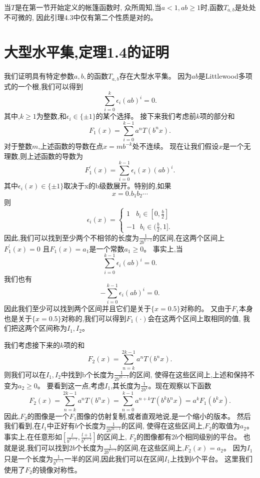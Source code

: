 \begin{remark}
      当$T$是在第一节开始定义的帐篷函数时,
      众所周知,当$a<1,ab\ge1$时,函数$T_{a,b}$是处处不可微的,
      因此引理$4.3$中仅有第二个性质是对的。
\end{remark}

\section{大型水平集,定理1.4的证明}

我们证明具有特定参数$a,b,$的函数$T_{a,b}$存在大型水平集。
因为$ab$是Littlewood多项式的一个根,我们可以得到
$$
\sum_{i=0}^k\epsilon_i(ab)^i=0.
$$
其中,$k\ge1$为整数,和$\epsilon_i\in\{\pm1\}$的某个选择。
接下来我们考虑前$k$项的部分和
$$
F_1(x)=\sum_{i=0}^{k-1}a^nT(b^nx).
$$
对于整数$m$,上述函数的导数在点$x=mb^{-k}$处不连续。
现在让我们假设$x$是一个无理数,则上述函数的导数为
$$
F_1^\prime(x)=\sum_{i=0}^{k-1}\epsilon_i(x)(ab)^i.
$$
其中$\epsilon_i(x)\in\{\pm1\}$取决于x的b级数展开。特别的,如果
$$
x=0.b_1b_2\cdots
$$
则
$$
\epsilon_i(x)=\begin{cases}1~~~~b_i\in[0,\frac{b}{2}]\\-1~~~b_i\in(\frac{b}{2},1].\end{cases}
$$
因此,我们可以找到至少两个不相邻的长度为$\frac{1}{2b^{k-1}}$的区间,在这两个区间上$F_1^\prime(x)=0$
且$F_1(x)=a_1$是一个常数$a_1\ge0$。
事实上,当
$$
\sum_{i=0}^{k-1}\epsilon_i(ab)^i=0.
$$
我们也有
$$
-\sum_{i=0}^{k-1}\epsilon_i(ab)^i=0.
$$
因此我们至少可以找到两个区间并且它们是关于$\{x=0.5\}$对称的。
又由于$F_1$本身也是关于$\{x=0.5\}$对称的,我们可以得到$F_1(\cdot)$会在这两个区间上取相同的值,
我们把这两个区间称为$I_1,I_2$。

我们考虑接下来的$k$项的和
$$
F_2(x)=\sum_{n=k}^{2k-1}a^nT(b^nx).
$$
则我们可以在$I_1,I_2$中找到b个长度为$\frac{1}{2b^{2k-1}}$的区间,
使得在这些区间上,上述和保持不变为$a_2\ge0$。
要看到这一点,考虑$I_1$,其长度为$\frac{1}{2b^k}$。现在观察以下函数
$$
F_2(x)=\sum_{n=k}^{2k-1}a^nT(b^nx)=\sum_{n=0}^{k-1}a^{n+k}T(b^kb^nx)=a^kF_1(b^kx).
$$
因此,$F_2$的图像是一个$F_1$图像的仿射复制,或者直观地说,是一个缩小的版本。
然后我们看到,在$I_1$中正好有$b$个长度为$\frac{1}{2b^{2k-1}}$的区间,
使得在这些区间上,$F_2$的取值为$a_2$。
事实上,在任意形如$[\frac{l}{b^{k-1}},\frac{l+1}{b^{k-1}}]$的区间上,
$F_2$的图像都有$2b$个相同级别的平台。
也就是说,我们可以找到$2b$个长度为$\frac{1}{2b^{k-1}}$的区间,在这些区间上,$F_2(x)=a_2$。
因为$I_1$只是一个长度为$\frac{1}{b^{k-1}}$一半的区间,因此我们可以在区间$I_1$上找到$b$个平台。
这里我们使用了$F_2$的镜像对称性。


